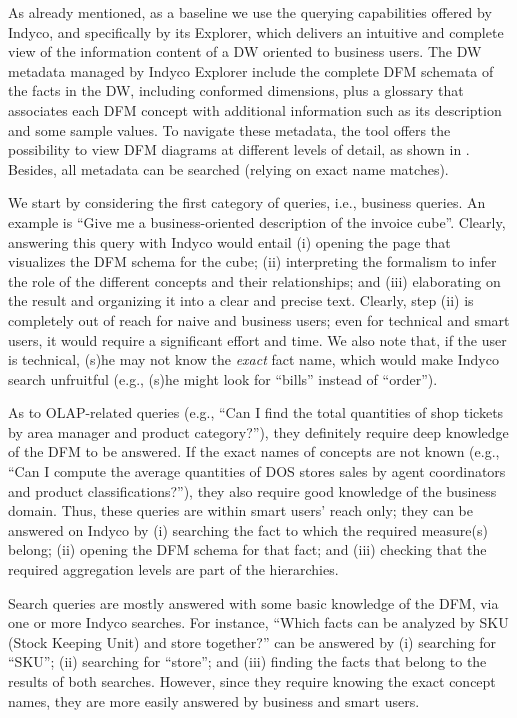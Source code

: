 As already mentioned, as a baseline we use the querying capabilities offered by Indyco, and specifically by its Explorer, which delivers an intuitive and complete view of the information content of a DW oriented to business users. The DW metadata managed by Indyco Explorer include the complete DFM schemata of the facts in the DW, including conformed dimensions, plus a glossary that associates each DFM concept with additional information such as its description and some sample values. To navigate these metadata, the tool offers the possibility to view DFM diagrams at different levels of detail, as shown in . Besides, all metadata can be searched (relying on exact name matches).

We start by considering the first category of queries, i.e., business queries. An example is ``Give me a business-oriented description of the invoice cube''. Clearly, answering this query with Indyco would entail (i) opening the page that visualizes the DFM schema for the  cube; (ii) interpreting the formalism to infer the role of the different concepts and their relationships; and (iii) elaborating on the result and organizing it into a clear and precise text. Clearly, step (ii) is completely out of reach for naive and business users; even for technical and smart users, it would require a significant effort and time. We also note that, if the user is technical, (s)he may not know the \emph{exact} fact name, which would make Indyco search unfruitful (e.g., (s)he might look for ``bills'' instead of ``order'').

As to OLAP-related queries (e.g., ``Can I find the total quantities of shop tickets by area manager and product category?''), they definitely require deep knowledge of the DFM to be answered. If the exact names of concepts are not known (e.g., ``Can I compute the average quantities of DOS stores sales by agent coordinators and product classifications?''), they also require good knowledge of the business domain. Thus, these queries are within smart users' reach only; they can be answered on Indyco by (i) searching the fact to which the required measure(s) belong; (ii) opening the DFM schema for that fact; and (iii) checking that the required aggregation levels are part of the hierarchies.

Search queries are mostly answered with some basic knowledge of the DFM, via one or more Indyco searches. For instance, ``Which facts can be analyzed by SKU (Stock Keeping Unit) and store together?'' can be answered by (i) searching for ``SKU''; (ii) searching for ``store''; and (iii) finding the facts that belong to the results of both searches.
However, since they require knowing the exact concept names, they are more easily answered by business and smart users.

